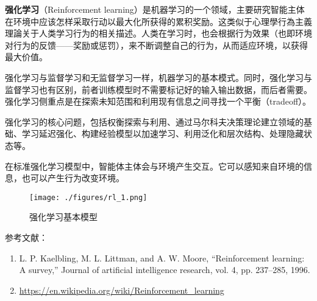 
\textbf{强化学习}（Reinforcement learning）是机器学习的一个领域，主要研究智能主体在环境中应该怎样采取行动以最大化所获得的累积奖励。这类似于心理學行為主義理論关于人类学习行为的相关描述。人类在学习时，也会根据行为效果（也即环境对行为的反馈——奖励或惩罚），来不断调整自己的行为，从而适应环境，以获得最大价值。

强化学习与监督学习和无监督学习一样，机器学习的基本模式。同时，强化学习与监督学习也有区别，前者训练模型时不需要标记好的输入输出数据，而后者需要。强化学习侧重点是在探索未知范围和利用现有信息之间寻找一个平衡（tradeoff）。

强化学习的核心问题，包括权衡探索与利用、通过马尔科夫决策理论建立领域的基础、学习延迟强化、构建经验模型以加速学习、利用泛化和层次结构、处理隐藏状态等。

在标准强化学习模型中，智能体主体会与环境产生交互。它可以感知来自环境的信息，也可以产生行为改变环境。

\begin{figure}[ht]
\centering
\texttt{[image: ./figures/rl\_1.png]}
\caption{强化学习基本模型} \label{rl_fig1}
\end{figure}



参考文献：
\begin{enumerate}
\item L. P. Kaelbling, M. L. Littman, and A. W. Moore, “Reinforcement learning: A survey,” Journal of artificial intelligence research, vol. 4, pp. 237–285, 1996.
\item \href{https://en.wikipedia.org/wiki/Reinforcement\_learning}{https://en.wikipedia.org/wiki/Reinforcement\_learning}
\end{enumerate}
